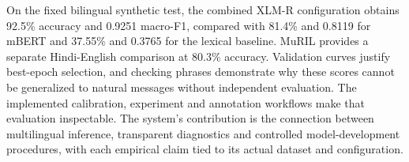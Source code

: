 \documentclass[conference]{IEEEtran}
\begin{document}
On the fixed bilingual synthetic test, the combined XLM-R configuration obtains 92.5\% accuracy and 0.9251 macro-F1, compared with 81.4\% and 0.8119 for mBERT and 37.55\% and 0.3765 for the lexical baseline. MuRIL provides a separate Hindi-English comparison at 80.3\% accuracy. Validation curves justify best-epoch selection, and checking phrases demonstrate why these scores cannot be generalized to natural messages without independent evaluation. The implemented calibration, experiment and annotation workflows make that evaluation inspectable. The system's contribution is the connection between multilingual inference, transparent diagnostics and controlled model-development procedures, with each empirical claim tied to its actual dataset and configuration.

\begingroup
{}


\endgroup
\end{document}
